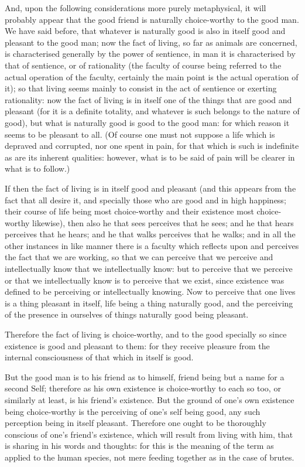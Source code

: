 And, upon the following considerations more purely metaphysical, it will
probably appear that the good friend is naturally choice-worthy to the good
man. We have said before, that whatever is naturally good is also in itself
good and pleasant to the good man; now the fact of living, so far as animals
are concerned, is characterised generally by the power of sentience, in man it
is characterised by that of sentience, or of rationality (the faculty of course
being referred to the actual operation of the faculty, certainly the main point
is the actual operation of it); so that living seems mainly to consist in the
act of sentience or exerting rationality: now the fact of living is in itself
one of the things that are good and pleasant (for it is a definite totality,
and whatever is such belongs to the nature of good), but what is naturally good
is good to the good man: for which reason it seems to be pleasant to all. (Of
course one must not suppose a life which is depraved and corrupted, nor one
spent in pain, for that which is such is indefinite as are its inherent
qualities: however, what is to be said of pain will be clearer in what is to
follow.)

If then the fact of living is in itself good and pleasant (and this appears
from the fact that all desire it, and specially those who are good and in high
happiness; their course of life being most choice-worthy and their existence
most choice-worthy likewise), then also he that sees perceives that he sees;
and he that hears perceives that he hears; and he that walks perceives that he
walks; and in all the other instances in like manner there is a faculty which
reflects upon and perceives the fact that we are working, so that we can
perceive that we perceive and intellectually know that we intellectually know:
but to perceive that we perceive or that we intellectually know is to perceive
that we exist, since existence was defined to be perceiving or intellectually
knowing. Now to perceive that one lives is a thing pleasant in itself, life
being a thing naturally good, and the perceiving of the presence in ourselves
of things naturally good being pleasant.

Therefore the fact of living is choice-worthy, and to the good specially so
since existence is good and pleasant to them: for they receive pleasure from
the internal consciousness of that which in itself is good.

But the good man is to his friend as to himself, friend being but a name for a
second Self; therefore as his own existence is choice-worthy to each so too, or
similarly at least, is his friend’s existence. But the ground of
one’s own existence being choice-worthy is the perceiving of one’s
self being good, any such perception being in itself pleasant. Therefore one
ought to be thoroughly conscious of one’s friend’s existence, which
will result from living with him, that is sharing in his words and thoughts:
for this is the meaning of the term as applied to the human species, not mere
feeding together as in the case of brutes.


